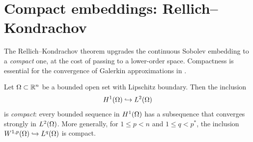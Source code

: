 \section{Compact embeddings: Rellich--Kondrachov}\label{sec:rellich}

The Rellich--Kondrachov theorem upgrades the continuous Sobolev embedding to a
\emph{compact} one, at the cost of passing to a lower-order space.
Compactness is essential for the convergence of Galerkin approximations in
.

\begin{theorem}%
  \label{thm:rellich-kondrachov}
  Let $\Omega \subset \mathbb{R}^{n}$ be a bounded open set with Lipschitz boundary.  Then the
  inclusion
  \[
    H^{1}(\Omega) \hookrightarrow L^{2}(\Omega)
  \]
  is \emph{compact}: every bounded sequence in $H^{1}(\Omega)$ has a subsequence that
  converges strongly in $L^{2}(\Omega)$.  More generally, for $1 \le p < n$ and
  $1 \le q < p^{*}$, the inclusion $W^{1,p}(\Omega) \hookrightarrow L^{q}(\Omega)$ is
  compact.
\end{theorem}


